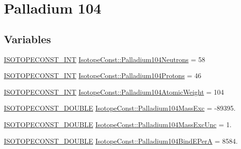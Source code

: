 \hypertarget{group___isotope_const-_palladium-_pd104}{}\section{Palladium 104}
\label{group___isotope_const-_palladium-_pd104}
\subsection*{Variables}
\begin{DoxyCompactItemize}
\item 
\mbox{\hyperlink{group___isotope_const-_macros_ga5f18360b3e99483a35c32d789e62621c}{I\+S\+O\+T\+O\+P\+E\+C\+O\+N\+S\+T\+\_\+\+I\+NT}} \mbox{\hyperlink{group___isotope_const-_palladium-_pd104_gad513aa0abc2b9c4267a639fcf7c7e4ca}{Isotope\+Const\+::\+Palladium104\+Neutrons}} = 58
\item 
\mbox{\hyperlink{group___isotope_const-_macros_ga5f18360b3e99483a35c32d789e62621c}{I\+S\+O\+T\+O\+P\+E\+C\+O\+N\+S\+T\+\_\+\+I\+NT}} \mbox{\hyperlink{group___isotope_const-_palladium-_pd104_gaeca5e9ed31a18f28ced9d94c4553602c}{Isotope\+Const\+::\+Palladium104\+Protons}} = 46
\item 
\mbox{\hyperlink{group___isotope_const-_macros_ga5f18360b3e99483a35c32d789e62621c}{I\+S\+O\+T\+O\+P\+E\+C\+O\+N\+S\+T\+\_\+\+I\+NT}} \mbox{\hyperlink{group___isotope_const-_palladium-_pd104_ga55118dd1074bcdae68e4c42f45e7f4ed}{Isotope\+Const\+::\+Palladium104\+Atomic\+Weight}} = 104
\item 
\mbox{\hyperlink{group___isotope_const-_macros_ga8f45a7272ce02c0b4c65c44636ed719a}{I\+S\+O\+T\+O\+P\+E\+C\+O\+N\+S\+T\+\_\+\+D\+O\+U\+B\+LE}} \mbox{\hyperlink{group___isotope_const-_palladium-_pd104_ga8917e5e0f6ca3de3f185956cdf75ec8b}{Isotope\+Const\+::\+Palladium104\+Mass\+Exc}} = -\/89395.
\item 
\mbox{\hyperlink{group___isotope_const-_macros_ga8f45a7272ce02c0b4c65c44636ed719a}{I\+S\+O\+T\+O\+P\+E\+C\+O\+N\+S\+T\+\_\+\+D\+O\+U\+B\+LE}} \mbox{\hyperlink{group___isotope_const-_palladium-_pd104_ga24c7f30c73201bdd283305a430203434}{Isotope\+Const\+::\+Palladium104\+Mass\+Exc\+Unc}} = 1.
\item 
\mbox{\hyperlink{group___isotope_const-_macros_ga8f45a7272ce02c0b4c65c44636ed719a}{I\+S\+O\+T\+O\+P\+E\+C\+O\+N\+S\+T\+\_\+\+D\+O\+U\+B\+LE}} \mbox{\hyperlink{group___isotope_const-_palladium-_pd104_ga9f39b6c2e0d30e1293ba3e402d682c4d}{Isotope\+Const\+::\+Palladium104\+Bind\+E\+PerA}} = 8584.
\item 

\end{DoxyCompactItemize}
